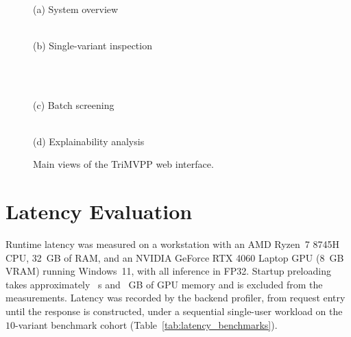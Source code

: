 \begin{figure}[htbp]
    \centering
    \begin{minipage}{0.48\textwidth}\centering
        \\[2pt]
        \small (a) System overview
    \end{minipage}\hfill
    \begin{minipage}{0.48\textwidth}\centering
        \\[2pt]
        \small (b) Single-variant inspection
    \end{minipage}\\[8pt]
    \begin{minipage}{0.48\textwidth}\centering
        \\[2pt]
        \small (c) Batch screening
    \end{minipage}\hfill
    \begin{minipage}{0.48\textwidth}\centering
        \\[2pt]
        \small (d) Explainability analysis
    \end{minipage}
    \caption{Main views of the TriMVPP web interface.}
    \label{fig:web_interface}
\end{figure}

\section{Latency Evaluation}
\label{sec:latency}

Runtime latency was measured on a workstation with an AMD Ryzen~7 8745H CPU, 32~GB of RAM, and an NVIDIA GeForce RTX 4060 Laptop GPU (8~GB VRAM) running Windows~11, with all inference in FP32. Startup preloading takes approximately \tbd{}~s and \tbd{}~GB of GPU memory and is excluded from the measurements. %
Latency was recorded by the backend profiler, from request entry until the response is constructed, under a sequential single-user workload on the $10$-variant benchmark cohort (Table~\ref{tab:latency_benchmarks}).

